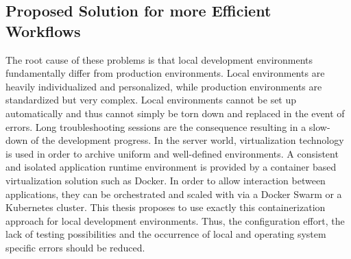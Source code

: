         \subsection{Proposed Solution for more Efficient Workflows}
        The root cause of these problems is that local development environments fundamentally differ from production environments. Local environments are heavily individualized and personalized, while production environments are standardized but very complex. Local environments cannot be set up automatically and thus cannot simply be torn down and replaced in the event of errors. Long troubleshooting sessions are the consequence resulting in a slow-down of the development progress.\newline
        In the server world, virtualization technology is used in order to archive uniform and well-defined environments. A consistent and isolated application runtime environment is provided by a container based virtualization solution such as Docker. In order to allow interaction between applications, they can be orchestrated and scaled with via a Docker Swarm or a Kubernetes cluster.\newline
        This thesis proposes to use exactly this containerization approach for local development environments. Thus, the configuration effort, the lack of testing possibilities and the occurrence of local and operating system specific errors should be reduced.
        \newpage
